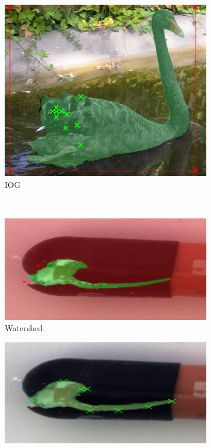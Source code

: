 \begin{figure}
\begin{subfigure}[t]{0.3\textwidth}
		\centering
		\includegraphics[width=\textwidth]{figures/appendix/method_predictions/swan34_iog.png}
		\caption{
			IOG
		}
	\end{subfigure}
	\\
	\begin{subfigure}[t]{0.3\textwidth}
		\centering
		\includegraphics[width=\textwidth]{figures/appendix/method_predictions/pill78_watershed.png}
		\caption{
			Watershed
		}
	\end{subfigure}
	\hfill
	\begin{subfigure}[t]{0.3\textwidth}
		\centering
		\includegraphics[width=\textwidth]{figures/appendix/method_predictions/pill78_dextr.png}

\end{subfigure}
\end{figure}
